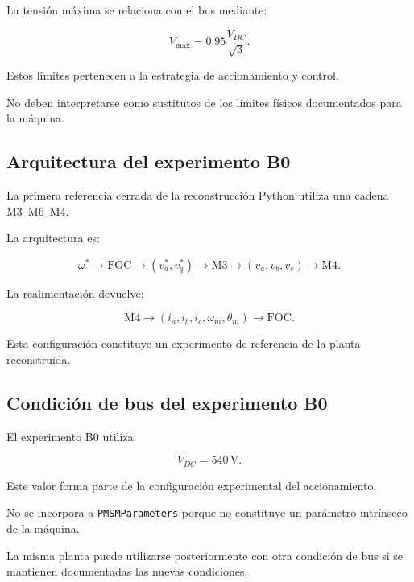 La tensión máxima se relaciona con el bus mediante:

\begin{equation}
V_{\max}
=
0.95
\frac{V_{DC}}{\sqrt{3}}.
\end{equation}

Estos límites pertenecen a la estrategia de accionamiento y control.

No deben interpretarse como sustitutos de los límites físicos documentados para la máquina.

\subsection{Arquitectura del experimento B0}

La primera referencia cerrada de la reconstrucción Python utiliza una cadena M3--M6--M4.

La arquitectura es:

\begin{equation}
\omega^\ast
\rightarrow
\mathrm{FOC}
\rightarrow
(v_d^\ast,v_q^\ast)
\rightarrow
\mathrm{M3}
\rightarrow
(v_a,v_b,v_c)
\rightarrow
\mathrm{M4}.
\end{equation}

La realimentación devuelve:

\begin{equation}
\mathrm{M4}
\rightarrow
(i_a,i_b,i_c,\omega_m,\theta_m)
\rightarrow
\mathrm{FOC}.
\end{equation}

Esta configuración constituye un experimento de referencia de la planta reconstruida.

\subsection{Condición de bus del experimento B0}

El experimento B0 utiliza:

\begin{equation}
V_{DC}=540\,\mathrm{V}.
\end{equation}

Este valor forma parte de la configuración experimental del accionamiento.

No se incorpora a \texttt{PMSMParameters} porque no constituye un parámetro intrínseco de la máquina.

La misma planta puede utilizarse posteriormente con otra condición de bus si se mantienen documentadas las nuevas condiciones.

